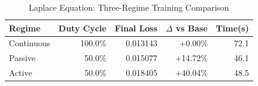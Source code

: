 \begin{table}[htbp]
\centering
\caption{Laplace Equation: Three-Regime Training Comparison}
\label{tab:laplace_regimes}
\begin{tabular}{lrrrr}
\hline
Regime & Duty Cycle & Final Loss & $\Delta$ vs Base & Time(s) \\
\hline
Continuous & 100.0\% & 0.013143 & +0.00\% & 72.1 \\
Passive & 50.0\% & 0.015077 & +14.72\% & 46.1 \\
Active & 50.0\% & 0.018405 & +40.04\% & 48.5 \\
\hline
\end{tabular}
\end{table}
